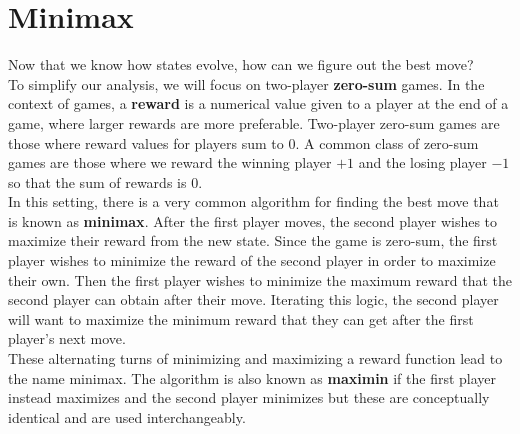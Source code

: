 \documentclass[12pt, letterpaper]{article}
\begin{document}
\section*{Minimax}
Now that we know how states evolve, how can we figure out the best move? \\[0.2cm]
To simplify our analysis, we will focus on two-player \textbf{zero-sum} games. In the context of games, a \textbf{reward} is a numerical value given to a player at the end of a game, where larger rewards are more preferable. Two-player zero-sum games are those where reward values for players sum to $0$. A common class of zero-sum games are those where we reward the winning player $+1$ and the losing player $-1$ so that the sum of rewards is $0$. \\[0.2cm]
In this setting, there is a very common algorithm for finding the best move that is known as \textbf{minimax}. After the first player moves, the second player wishes to maximize their reward from the new state. Since the game is zero-sum, the first player wishes to minimize the reward of the second player in order to maximize their own. Then the first player wishes to minimize the maximum reward that the second player can obtain after their move. Iterating this logic, the second player will want to maximize the minimum reward that they can get after the first player's next move. \\[0.2cm]
These alternating turns of minimizing and maximizing a reward function lead to the name minimax. The algorithm is also known as \textbf{maximin} if the first player instead maximizes and the second player minimizes but these are conceptually identical and are used interchangeably.
\end{document}

